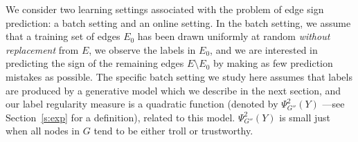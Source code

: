 We consider two learning settings associated with the problem of edge sign prediction: a batch setting and an online setting. In the batch setting, we assume that a training set of edges $E_0$ has been drawn uniformly at random {\em without replacement} from $E$, we observe the labels in $E_0$, and we are interested in predicting the sign of the remaining edges $E \setminus E_0$ by making as few prediction mistakes as possible. 
%
%
The specific batch setting 
we study here assumes that labels are produced by a generative model which we describe in the next section, and our label regularity measure is a quadratic function (denoted by $\Psi^2_{G''}(Y)$ ---see Section~\ref{s:exp} for a definition), related to this model. $\Psi^2_{G''}(Y)$ is small just when all nodes in $G$ tend to be either troll or trustworthy. 

